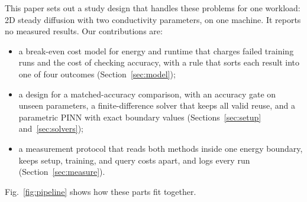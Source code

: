 \documentclass[conference]{IEEEtran}
\begin{document}
This paper sets out a study design that handles these problems for one workload: 2D steady diffusion with two conductivity parameters, on one machine. It reports no measured results. Our contributions are:
\begin{itemize}
\item a break-even cost model for energy and runtime that charges failed training runs and the cost of checking accuracy, with a rule that sorts each result into one of four outcomes (Section~\ref{sec:model});
\item a design for a matched-accuracy comparison, with an accuracy gate on unseen parameters, a finite-difference solver that keeps all valid reuse, and a parametric PINN with exact boundary values (Sections~\ref{sec:setup} and~\ref{sec:solvers});
\item a measurement protocol that reads both methods inside one energy boundary, keeps setup, training, and query costs apart, and logs every run (Section~\ref{sec:measure}).
\end{itemize}
Fig.~\ref{fig:pipeline} shows how these parts fit together.
\end{document}

